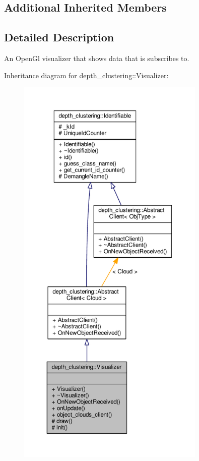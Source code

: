 \subsection*{Additional Inherited Members}


\subsection{Detailed Description}
An Open\-Gl visualizer that shows data that is subscribes to. 

Inheritance diagram for depth\-\_\-clustering\-:\-:Visualizer\-:
\nopagebreak
\begin{figure}[H]
\begin{center}
\leavevmode
\includegraphics[height=550pt]{classdepth__clustering_1_1Visualizer__inherit__graph}
\end{center}
\end{figure}


